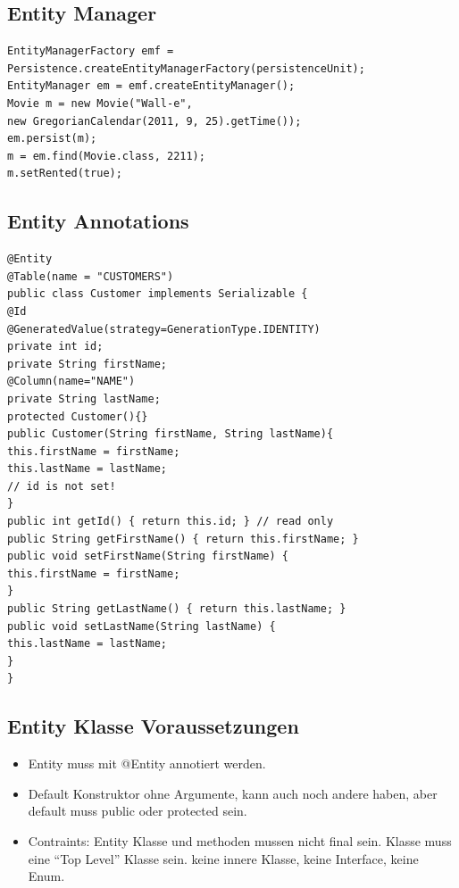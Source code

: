 \documentclass[a4paper,10pt]{scrreprt}
\begin{document}
\subsection{Entity Manager}
\begin{lstlisting}[caption=Entity Manager JPA]
 EntityManagerFactory emf =
Persistence.createEntityManagerFactory(persistenceUnit);
EntityManager em = emf.createEntityManager();
Movie m = new Movie("Wall-e",
new GregorianCalendar(2011, 9, 25).getTime());
em.persist(m);
m = em.find(Movie.class, 2211);
m.setRented(true);
\end{lstlisting}

\subsection{Entity Annotations}
\begin{lstlisting}[caption=JPA Annotations for Entities]
 @Entity
@Table(name = "CUSTOMERS")
public class Customer implements Serializable {
@Id
@GeneratedValue(strategy=GenerationType.IDENTITY)
private int id;
private String firstName;
@Column(name="NAME")
private String lastName;
protected Customer(){}
public Customer(String firstName, String lastName){
this.firstName = firstName;
this.lastName = lastName;
// id is not set!
}
public int getId() { return this.id; } // read only
public String getFirstName() { return this.firstName; }
public void setFirstName(String firstName) {
this.firstName = firstName;
}
public String getLastName() { return this.lastName; }
public void setLastName(String lastName) {
this.lastName = lastName;
}
}
\end{lstlisting}

\subsection{Entity Klasse Voraussetzungen}
\begin{itemize}
 \item Entity muss mit @Entity annotiert werden.
 \item Default Konstruktor ohne Argumente, kann auch noch andere haben, aber default muss public oder protected sein.
 \item Contraints:
 \subitem Entity Klasse und methoden mussen nicht final sein.
 \subitem Klasse muss eine ``Top Level'' Klasse sein.
 \subsubitem keine innere Klasse, keine Interface, keine Enum.
\end{itemize}
\end{document}
